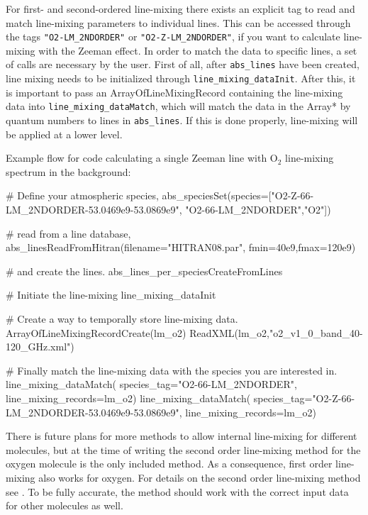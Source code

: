 For first- and second-ordered line-mixing there exists an explicit tag to read
and match line-mixing parameters to individual lines. This can be accessed
through the tags \verb|"O2-LM_2NDORDER"| or \verb|"O2-Z-LM_2NDORDER"|, if you
want to calculate line-mixing with the Zeeman effect. In order to match the data
to specific lines, a set of calls are necessary by the user. First of all,
after \verb|abs_lines| have been created, line mixing needs to be initialized
through \verb|line_mixing_dataInit|. After this, it is important to pass an
ArrayOfLineMixingRecord containing the line-mixing data into 
\verb|line_mixing_dataMatch|, which will match the data in the Array* by quantum
numbers to lines in \verb|abs_lines|. If this is done properly, line-mixing will
be applied at a lower level.

Example flow for code calculating a single Zeeman line with O$_2$ 
line-mixing spectrum in the background:
\begin{code}
# Define your atmospheric species,
abs_speciesSet(species=["O2-Z-66-LM_2NDORDER-53.0469e9-53.0869e9",
    "O2-66-LM_2NDORDER","O2"])

# read from a line database,
abs_linesReadFromHitran(filename="HITRAN08.par", 
    fmin=40e9,fmax=120e9)

# and create the lines.
abs_lines_per_speciesCreateFromLines

# Initiate the line-mixing
line_mixing_dataInit

# Create a way to temporally store line-mixing data.
ArrayOfLineMixingRecordCreate(lm_o2)
ReadXML(lm_o2,"o2_v1_0_band_40-120_GHz.xml")

# Finally match the line-mixing data with the species you 
are interested in.
line_mixing_dataMatch(
    species_tag="O2-66-LM_2NDORDER",
    line_mixing_records=lm_o2)
line_mixing_dataMatch(
    species_tag="O2-Z-66-LM_2NDORDER-53.0469e9-53.0869e9",
    line_mixing_records=lm_o2)
\end{code}

There is future plans for more methods to allow internal line-mixing for different molecules,
but at the time of writing the second order line-mixing method for the oxygen
molecule is the only included method.
As a consequence, first order line-mixing also works for oxygen.
For details on the second order line-mixing method see \citet{makarov11:_60-ghz_jqsrt}.
To be fully accurate, the method should work with the correct input data for other molecules as well.

